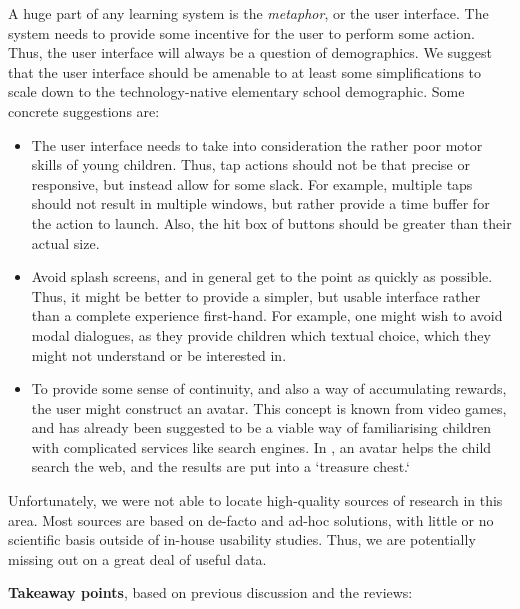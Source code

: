 A huge part of any learning system is the \textit{metaphor}, or the user
interface. The system needs to provide some incentive for the user to perform
some action. Thus, the user interface will always be a question of demographics.
We suggest that the user interface should be amenable to at least some
simplifications to scale down to the technology-native elementary school
demographic. Some concrete suggestions are:

\begin{itemize}
\item The user interface needs to take into consideration the rather poor motor
skills of young children.\cite{kidsquora} Thus, tap actions should not be that
precise or responsive, but instead allow for some slack. For example, multiple
taps should not result in multiple windows, but rather provide a time buffer for
the action to launch. Also, the hit box of buttons should be greater than their
actual size.
\item Avoid splash screens,\cite{kidsluke} and in general get to the point as quickly as
possible. Thus, it might be better to provide a simpler, but usable interface
rather than a complete experience first-hand. For example, one might wish to
avoid modal dialogues, as they provide children which textual choice, which they
might not understand or be interested in.
\item To provide some sense of continuity, and also a way of accumulating
rewards, the user might construct an avatar. This concept is known from video
games, and has already been suggested to be a viable way of familiarising
children with complicated services like search engines.
In \cite{gossen2012search}, an avatar helps the child search the web, and the
results are put into a `treasure chest.`
\end{itemize}

Unfortunately, we were not able to locate high-quality sources of research in
this area. Most sources are based on de-facto and ad-hoc solutions, with little
or no scientific basis outside of in-house usability studies. Thus, we are
potentially missing out on a great deal of useful data.


\textbf{Takeaway points}, based on previous discussion and the reviews:


